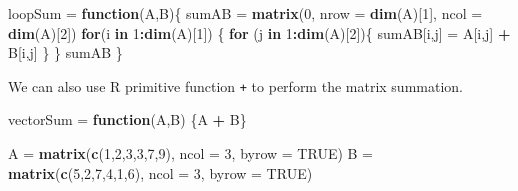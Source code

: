 \documentclass[
]{book}
\newenvironment{Shaded}{\begin{snugshade}}{\end{snugshade}}
\newcommand{\AttributeTok}[1]{\textcolor[rgb]{0.13,0.29,0.53}{#1}}
\newcommand{\ConstantTok}[1]{\textcolor[rgb]{0.56,0.35,0.01}{#1}}
\newcommand{\ControlFlowTok}[1]{\textcolor[rgb]{0.13,0.29,0.53}{\textbf{#1}}}
\newcommand{\DecValTok}[1]{\textcolor[rgb]{0.00,0.00,0.81}{#1}}
\newcommand{\FunctionTok}[1]{\textcolor[rgb]{0.13,0.29,0.53}{\textbf{#1}}}
\newcommand{\NormalTok}[1]{#1}
\newcommand{\OtherTok}[1]{\textcolor[rgb]{0.56,0.35,0.01}{#1}}
\newcommand{\SpecialCharTok}[1]{\textcolor[rgb]{0.81,0.36,0.00}{\textbf{#1}}}
\begin{document}
\begin{Shaded}
\begin{Highlighting}[]
\NormalTok{loopSum }\OtherTok{=} \ControlFlowTok{function}\NormalTok{(A,B)\{}
\NormalTok{    sumAB }\OtherTok{=} \FunctionTok{matrix}\NormalTok{(}\DecValTok{0}\NormalTok{, }\AttributeTok{nrow =} \FunctionTok{dim}\NormalTok{(A)[}\DecValTok{1}\NormalTok{], }\AttributeTok{ncol =} \FunctionTok{dim}\NormalTok{(A)[}\DecValTok{2}\NormalTok{])}
        \ControlFlowTok{for}\NormalTok{(i }\ControlFlowTok{in} \DecValTok{1}\SpecialCharTok{:}\FunctionTok{dim}\NormalTok{(A)[}\DecValTok{1}\NormalTok{]) \{}
            \ControlFlowTok{for}\NormalTok{ (j }\ControlFlowTok{in} \DecValTok{1}\SpecialCharTok{:}\FunctionTok{dim}\NormalTok{(A)[}\DecValTok{2}\NormalTok{])\{}
\NormalTok{                sumAB[i,j] }\OtherTok{=}\NormalTok{ A[i,j] }\SpecialCharTok{+}\NormalTok{ B[i,j]}
\NormalTok{             \}}
\NormalTok{         \}}
\NormalTok{    sumAB}
\NormalTok{ \}}
\end{Highlighting}
\end{Shaded}

We can also use R primitive function \texttt{+} to perform the matrix summation.

\begin{Shaded}
\begin{Highlighting}[]
\NormalTok{vectorSum }\OtherTok{=} \ControlFlowTok{function}\NormalTok{(A,B) \{A }\SpecialCharTok{+}\NormalTok{ B\}}
\end{Highlighting}
\end{Shaded}

\begin{Shaded}
\begin{Highlighting}[]
\NormalTok{A }\OtherTok{=} \FunctionTok{matrix}\NormalTok{(}\FunctionTok{c}\NormalTok{(}\DecValTok{1}\NormalTok{,}\DecValTok{2}\NormalTok{,}\DecValTok{3}\NormalTok{,}\DecValTok{3}\NormalTok{,}\DecValTok{7}\NormalTok{,}\DecValTok{9}\NormalTok{), }\AttributeTok{ncol =} \DecValTok{3}\NormalTok{, }\AttributeTok{byrow =} \ConstantTok{TRUE}\NormalTok{)}
\NormalTok{B }\OtherTok{=} \FunctionTok{matrix}\NormalTok{(}\FunctionTok{c}\NormalTok{(}\DecValTok{5}\NormalTok{,}\DecValTok{2}\NormalTok{,}\DecValTok{7}\NormalTok{,}\DecValTok{4}\NormalTok{,}\DecValTok{1}\NormalTok{,}\DecValTok{6}\NormalTok{), }\AttributeTok{ncol =} \DecValTok{3}\NormalTok{, }\AttributeTok{byrow =} \ConstantTok{TRUE}\NormalTok{)}
\end{Highlighting}
\end{Shaded}
\end{document}
